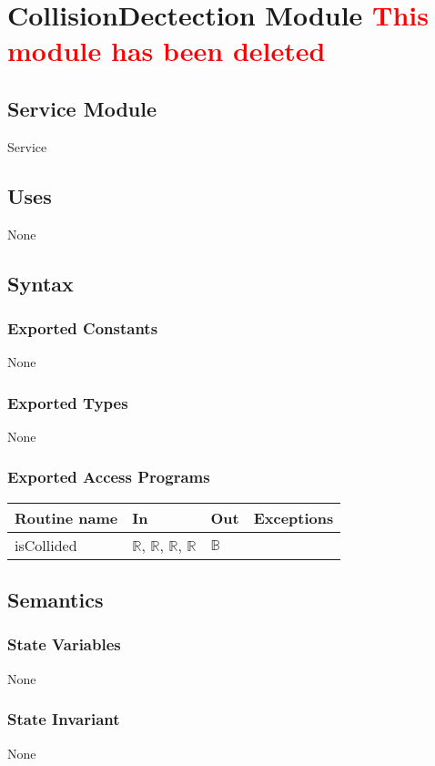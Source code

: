 \documentclass[12pt]{article}
\begin{document}
\newpage


\section{CollisionDectection Module \textcolor{red}{This module has been deleted}}

\subsection*{Service Module}
Service

\subsection*{Uses}
None

\subsection*{Syntax}
\subsubsection*{Exported Constants}
None
\subsubsection*{Exported Types}
None
\subsubsection*{Exported Access Programs}
\begin{tabular}{| l | l | l | p{5cm} |}
\hline
\textbf{Routine name} & \textbf{In} & \textbf{Out} & \textbf{Exceptions}\\
\hline
isCollided & $\mathbb{R}$, $\mathbb{R}$, $\mathbb{R}$, $\mathbb{R}$ & $\mathbb{B}$ & \\
\hline
\end{tabular}

\subsection*{Semantics}
\subsubsection*{State Variables}
None
\subsubsection*{State Invariant}
None
\end{document}
